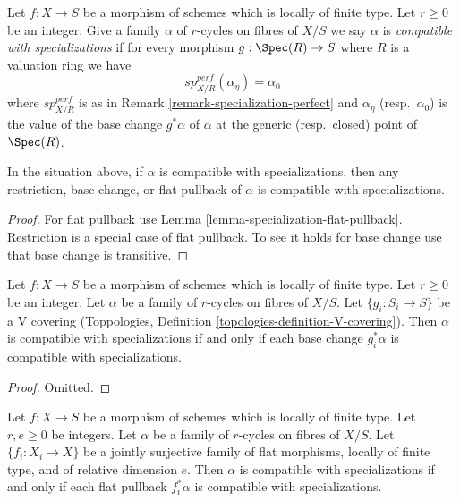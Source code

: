 \noindent
Let $f : X \to S$ be a morphism of schemes which is locally of finite type.
Let $r \geq 0$ be an integer. Give a family $\alpha$ of $r$-cycles on fibres
of $X/S$ we say $\alpha$ is {\it compatible with specializations} if
for every morphism $g : \Spec(R) \to S$ where $R$ is a valuation ring we have
$$
sp_{X/R}^{perf}(\alpha_\eta) = \alpha_0
$$
where $sp_{X/R}^{perf}$ is as in Remark \ref{remark-specialization-perfect}
and $\alpha_\eta$ (resp.\ $\alpha_0$) is the value of the base change
$g^*\alpha$ of $\alpha$ at the generic (resp.\ closed) point of $\Spec(R)$.

\begin{lemma}
\label{lemma-families-specialization}
In the situation above, if $\alpha$ is compatible with specializations,
then any restriction, base change, or flat pullback of $\alpha$ is compatible
with specializations.
\end{lemma}

\begin{proof}
For flat pullback use Lemma \ref{lemma-specialization-flat-pullback}.
Restriction is a special case of flat pullback. To see it holds for
base change use that base change is transitive.
\end{proof}

\begin{lemma}
\label{lemma-families-specialization-V-descent}
Let $f : X \to S$ be a morphism of schemes which is locally of finite type.
Let $r \geq 0$ be an integer. Let $\alpha$ be a family of $r$-cycles on fibres
of $X/S$. Let $\{g_i : S_i \to S\}$ be a V covering (Toppologies, Definition
\ref{topologies-definition-V-covering}). Then $\alpha$ is compatible
with specializations if and only if each base change $g_i^*\alpha$
is compatible with specializations.
\end{lemma}

\begin{proof}
Omitted.
\end{proof}

\begin{lemma}
\label{lemma-families-specialization-fppf-descent}
Let $f : X \to S$ be a morphism of schemes which is locally of finite type.
Let $r, e \geq 0$ be integers. Let $\alpha$ be a family of $r$-cycles on fibres
of $X/S$. Let $\{f_i : X_i \to X\}$ be a jointly surjective family
of flat morphisms, locally of finite type, and of relative dimension $e$.
Then $\alpha$ is compatible with specializations if and only if each flat
pullback $f_i^*\alpha$ is compatible with specializations.
\end{lemma}


